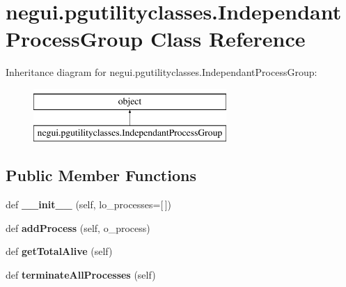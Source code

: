 \hypertarget{classnegui_1_1pgutilityclasses_1_1IndependantProcessGroup}{}\section{negui.\+pgutilityclasses.\+Independant\+Process\+Group Class Reference}
\label{classnegui_1_1pgutilityclasses_1_1IndependantProcessGroup}
Inheritance diagram for negui.\+pgutilityclasses.\+Independant\+Process\+Group\+:\begin{figure}[H]
\begin{center}
\leavevmode
\includegraphics[height=2.000000cm]{classnegui_1_1pgutilityclasses_1_1IndependantProcessGroup}
\end{center}
\end{figure}
\subsection*{Public Member Functions}
\begin{DoxyCompactItemize}
\item 
def {\bfseries \+\_\+\+\_\+init\+\_\+\+\_\+} (self, lo\+\_\+processes=\mbox{[}$\,$\mbox{]})\hypertarget{classnegui_1_1pgutilityclasses_1_1IndependantProcessGroup_a5a2b256aa2b103efa417acf0a81a7f79}{}\label{classnegui_1_1pgutilityclasses_1_1IndependantProcessGroup_a5a2b256aa2b103efa417acf0a81a7f79}

\item 
def {\bfseries add\+Process} (self, o\+\_\+process)\hypertarget{classnegui_1_1pgutilityclasses_1_1IndependantProcessGroup_a71d901e440fa95a6c225c1c940e0f77c}{}\label{classnegui_1_1pgutilityclasses_1_1IndependantProcessGroup_a71d901e440fa95a6c225c1c940e0f77c}

\item 
def {\bfseries get\+Total\+Alive} (self)\hypertarget{classnegui_1_1pgutilityclasses_1_1IndependantProcessGroup_a195395ab15074c744c38c8a8b324ce9b}{}\label{classnegui_1_1pgutilityclasses_1_1IndependantProcessGroup_a195395ab15074c744c38c8a8b324ce9b}

\item 
def {\bfseries terminate\+All\+Processes} (self)\hypertarget{classnegui_1_1pgutilityclasses_1_1IndependantProcessGroup_ae5adb0e0e693db6e9d82b1d801481634}{}\label{classnegui_1_1pgutilityclasses_1_1IndependantProcessGroup_ae5adb0e0e693db6e9d82b1d801481634}

\end{DoxyCompactItemize}


